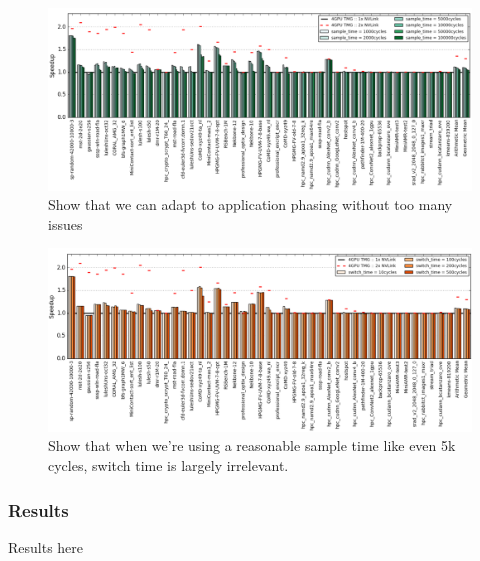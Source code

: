 \begin{figure}[tp]
    \centering
    \includegraphics[width=1.0\textwidth]{figures/sample-time.jpg}
    \caption{Show that we can adapt to application phasing without too many 
issues}
    \label{fig:sampletime}
\end{figure}


\begin{figure}[tp]
    \centering
    \includegraphics[width=1.0\textwidth]{figures/switch-time.jpg}
    \caption{Show that when we're using a reasonable sample time like even 5k 
cycles, switch time is largely irrelevant.}
    \label{fig:switchtime}
\end{figure}

\subsubsection{Results}
Results here